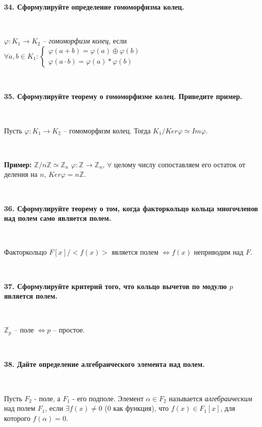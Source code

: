 \documentclass{article}
\begin{document}
	\textbf{34. Сформулируйте определение гомоморфизма колец.}
	
	{
		$\;$
		\setlength{\parindent}{0.4cm}
		\hangindent=0.4cm
		
		$\varphi:K_1\rightarrow K_2$ -- \textit{гомоморфизм колец}, если $\forall a, b\in K_1:\begin{cases}
		\varphi(a+b)=\varphi(a)\oplus\varphi(b)\\
		\varphi(a\cdot b)=\varphi(a)\ast\varphi(b)
		\end{cases}$
		
		$\;$
		\setlength{\parindent}{0cm}
		\hangindent=0cm
	}
	
	\textbf{35. Сформулируйте теорему о гомоморфизме колец. Приведите пример.}
	
	{
		$\;$
		\setlength{\parindent}{0.4cm}
		\hangindent=0.4cm
		
		Пусть $\varphi:K_1\rightarrow K_2$ -- гомоморфизм колец. Тогда $K_1/Ker\varphi\simeq Im\varphi$.
		
		$\;$
		
		\textbf{Пример:} $\mathbb{Z}/n\mathbb{Z}\simeq\mathbb{Z}_n$ $\varphi:\mathbb{Z}\rightarrow\mathbb{Z}_n$, $\forall$ целому числу сопоставляем его остаток от деления на $n$, $Ker \varphi=n\mathbb{Z}$.
		
		$\;$
		\setlength{\parindent}{0cm}
		\hangindent=0cm
	}
	
	\textbf{36. Сформулируйте теорему о том, когда факторкольцо кольца многочленов над полем само является полем.}
	
		{
		$\;$
		\setlength{\parindent}{0.4cm}
		\hangindent=0.4cm
		
		Факторкольцо $F[x]/<f(x)>$ является полем $\Leftrightarrow f(x)$ неприводим над $F$.
		
		$\;$
		\setlength{\parindent}{0cm}
		\hangindent=0cm
	}
	
	\textbf{37. Сформулируйте критерий того, что кольцо вычетов по модулю $p$ является полем.}
	
	{
		$\;$
		\setlength{\parindent}{0.4cm}
		\hangindent=0.4cm
		
		$\mathbb{Z}_p$ -- поле $\Leftrightarrow p$ -- простое.
		
		$\;$
		\setlength{\parindent}{0cm}
		\hangindent=0cm
	}
	
	 \textbf{38. Дайте определение алгебраического элемента над полем.}
	
	{
		$\;$
		\setlength{\parindent}{0.4cm}
		\hangindent=0.4cm
		
		Пусть $F_2$ - поле, а $F_1$ - его подполе. Элемент $\alpha\in F_2$ называется \textit{алгебраическим} над полем $F_1$, если $\exists f(x)\ne0$ (0 как функция), что $f(x)\in F_1[x]$, для которого $f(\alpha)=0$.
		
		$\;$
		\setlength{\parindent}{0cm}
		\hangindent=0cm
	}
	
\end{document}
